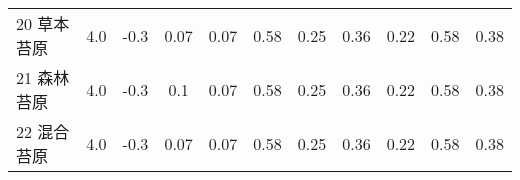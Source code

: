 \begin{landscape}
\begin{table}[htbp]
\begin{tabular}{@{}lcccccccccc@{}}
        20 草本苔原    & 4.0        & -0.3                                                                         & 0.07                                                                                                            & 0.07                                                                                                            & 0.58                                                                                                            & 0.25                                                                                                            & 0.36                                                                                                            & 0.22                                                                                                            & 0.58                                                                                                            & 0.38                                                                                                            \\
        21 森林苔原    & 4.0        & -0.3                                                                         & 0.1                                                                                                             & 0.07                                                                                                            & 0.58                                                                                                            & 0.25                                                                                                            & 0.36                                                                                                            & 0.22                                                                                                            & 0.58                                                                                                            & 0.38                                                                                                            \\
        22 混合苔原    & 4.0        & -0.3                                                                         & 0.07                                                                                                            & 0.07                                                                                                            & 0.58                                                                                                            & 0.25                                                                                                            & 0.36                                                                                                            & 0.22                                                                                                            & 0.58                                                                                                            & 0.38                                                                                                            \\

\end{tabular}
\end{table}
\end{landscape}
